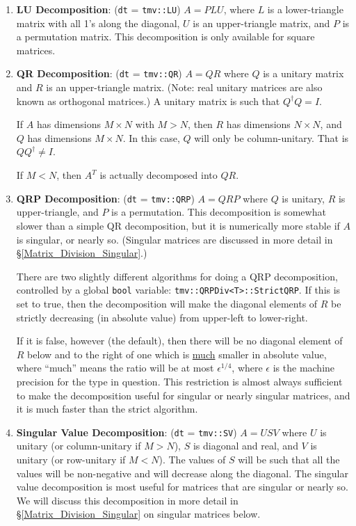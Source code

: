 \documentclass[twoside,letterpaper,11pt]{article}
\renewcommand{\tt}[1]{{\lstinline {#1}}}
\begin{document}
\begin{enumerate}
\item
\textbf{LU Decomposition}: 
(\tt{dt} = \tt{tmv::LU}) $A = P L U$, where $L$ is a lower-triangle 
matrix with all 1's along the diagonal, $U$ is an upper-triangle matrix, 
and $P$ is a permutation matrix.  This decomposition is only available for 
square matrices.

\item
\textbf{QR Decomposition}: 
(\tt{dt} = \tt{tmv::QR}) $A = Q R$ where $Q$ is a unitary matrix
and $R$ is an upper-triangle matrix.  (Note: real unitary matrices are
also known as orthogonal matrices.)  A unitary matrix is such that
$Q^\dagger Q = I$. 

If $A$ has dimensions $M \times N$ with $M > N$, 
then $R$ has dimensions $N \times N$, and $Q$
has dimensions $M \times N$.  In this case, $Q$ will
only be column-unitary.  That is $Q Q^\dagger \neq I$.

If $M < N$, then $A^T$ is actually decomposed into $Q R$.

\item
\textbf{QRP Decomposition}: 
(\tt{dt} = \tt{tmv::QRP}) $A = Q R P$ where $Q$ is unitary, $R$ is 
upper-triangle, and $P$ is a permutation.  This decomposition is somewhat
slower than a simple QR decomposition, but it is numerically more stable if
$A$ is singular, or nearly so.  
(Singular matrices are discussed in more detail in \S\ref{Matrix_Division_Singular}.)

There are two slightly different algorithms for doing a QRP decomposition, controlled by a global
\tt{bool} variable: \tt{tmv::QRPDiv<T>::StrictQRP}.
If this is set to true, then the decomposition will make the diagonal elements
of $R$ be strictly decreasing (in absolute value) from upper-left to lower-right.

If it is false, however (the default), then there will be no diagonal element
of $R$ below and to the right of one which is \underline{much} smaller in absolute value,
where ``much'' means the ratio will be at most $\epsilon^{1/4}$, where 
$\epsilon$ is the machine precision for the type in question.  This restriction
is almost always sufficient to make the decomposition useful for singular or nearly
singular matrices, and it is much faster than the strict algorithm.

\item
\textbf{Singular Value Decomposition}: 
(\tt{dt} = \tt{tmv::SV}) $A = U S V$ where $U$ is unitary
(or column-unitary if $M > N$), $S$ is diagonal and real, and $V$ is unitary 
(or row-unitary if $M < N$).  The values of $S$ will be such that all the values will
be non-negative and will decrease along the diagonal.
The singular value decomposition is most useful
for matrices that are singular or nearly so.  
We will discuss this decomposition in more detail in \S\ref{Matrix_Division_Singular} on
singular matrices below.

\end{enumerate}
\end{document}
